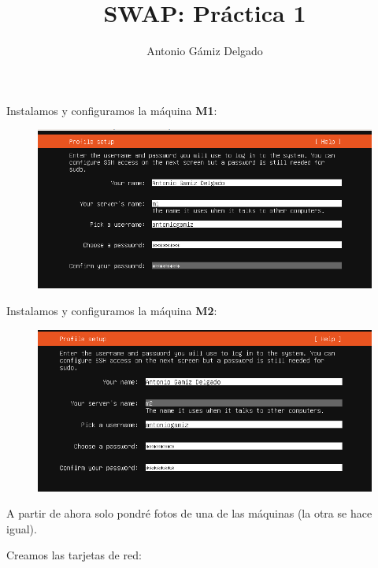 \documentclass[12pt]{article}
\title{SWAP: Práctica 1}
\author{
        Antonio Gámiz Delgado
}
\begin{document}
\maketitle



Instalamos y configuramos la máquina \textbf{M1}:

\begin{figure}[H]
  \center
  \includegraphics[scale=0.5]{img/1.png}
\end{figure}

Instalamos y configuramos la máquina \textbf{M2}:

\begin{figure}[H]
  \center
  \includegraphics[scale=0.5]{img/2.png}
\end{figure}

A partir de ahora solo pondré fotos de una de las máquinas (la otra se hace igual). 

\newpage

Creamos las tarjetas de red:
\end{document}
